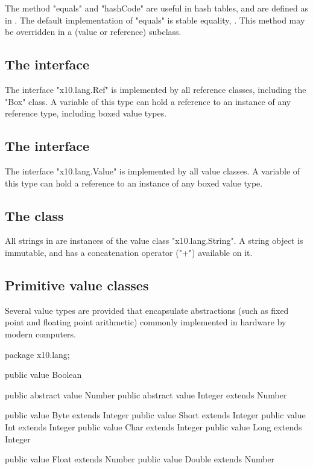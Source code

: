 The method \xcd"equals" and \xcd"hashCode" are useful in hash tables,
and are defined as in \java. The default implementation of \xcd"equals"
is stable equality, . This method may be overridden
in a (value or reference) subclass.

\subsection{The interface }
\label{Ref}

The interface \xcd"x10.lang.Ref" is implemented by all reference
classes, including the \xcd"Box" class.
A variable of this type can hold a reference to an instance of any
reference type, including boxed value types.

\subsection{The interface }
\label{Value}

The interface \xcd"x10.lang.Value" is implemented by all value
classes.
A variable of this type can hold a reference to an instance of any
boxed value type.

\subsection{The class }
\label{String}

All strings in \Xten{} are instances of the value class
\xcd"x10.lang.String".
A string object is immutable,
and has a concatenation operator (\xcd"+") available on it.

\subsection{Primitive value classes}

Several value types are provided that encapsulate
abstractions (such as fixed point and floating point arithmetic)
commonly implemented in hardware by modern computers.

\begin{xten}
package x10.lang;

public value Boolean { }

public abstract value Number { }
public abstract value Integer extends Number { }

public value Byte extends Integer  { }
public value Short extends Integer { }
public value Int extends Integer   { }
public value Char extends Integer  { }
public value Long extends Integer  { }

public value Float extends Number  { }
public value Double extends Number { }
\end{xten}

